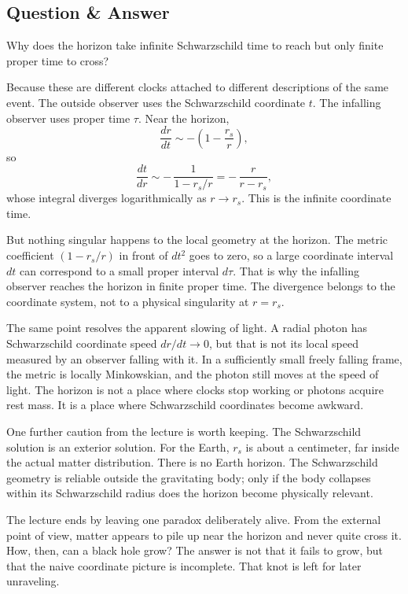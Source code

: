 \subsection{Question \& Answer}

Why does the horizon take infinite Schwarzschild time to reach but only finite proper time to cross?

Because these are different clocks attached to different descriptions of the same event. The outside observer uses the Schwarzschild coordinate \(t\). The infalling observer uses proper time \(\tau\). Near the horizon,
\begin{equation}
\frac{dr}{dt}\sim -\left(1-\frac{r_s}{r}\right),
\end{equation}
so
\begin{equation}
\frac{dt}{dr}\sim -\,\frac{1}{1-r_s/r}=-\,\frac{r}{r-r_s},
\end{equation}
whose integral diverges logarithmically as \(r\to r_s\). This is the infinite coordinate time.

But nothing singular happens to the local geometry at the horizon. The metric coefficient \(\left(1-r_s/r\right)\) in front of \(dt^2\) goes to zero, so a large coordinate interval \(dt\) can correspond to a small proper interval \(d\tau\). That is why the infalling observer reaches the horizon in finite proper time. The divergence belongs to the coordinate system, not to a physical singularity at \(r=r_s\).

The same point resolves the apparent slowing of light. A radial photon has Schwarzschild coordinate speed \(dr/dt\to 0\), but that is not its local speed measured by an observer falling with it. In a sufficiently small freely falling frame, the metric is locally Minkowskian, and the photon still moves at the speed of light. The horizon is not a place where clocks stop working or photons acquire rest mass. It is a place where Schwarzschild coordinates become awkward.

One further caution from the lecture is worth keeping. The Schwarzschild solution is an exterior solution. For the Earth, \(r_s\) is about a centimeter, far inside the actual matter distribution. There is no Earth horizon. The Schwarzschild geometry is reliable outside the gravitating body; only if the body collapses within its Schwarzschild radius does the horizon become physically relevant.

The lecture ends by leaving one paradox deliberately alive. From the external point of view, matter appears to pile up near the horizon and never quite cross it. How, then, can a black hole grow? The answer is not that it fails to grow, but that the naive coordinate picture is incomplete. That knot is left for later unraveling.

